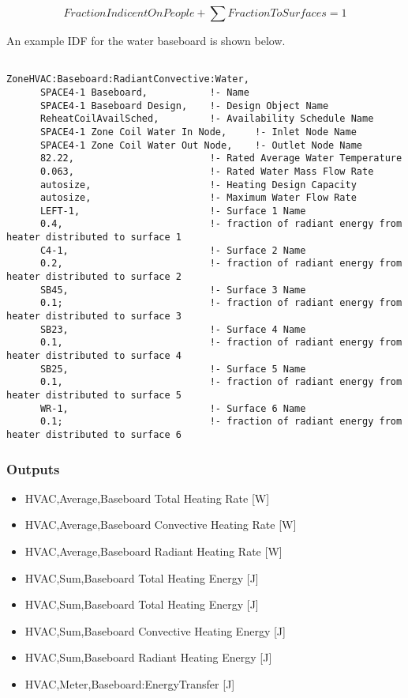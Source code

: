 \begin{equation}
FractionIndicentOnPeople + \sum {FractionToSurfaces = 1}
\end{equation}

An example IDF for the water baseboard is shown below.

\begin{lstlisting}

ZoneHVAC:Baseboard:RadiantConvective:Water,
      SPACE4-1 Baseboard,           !- Name
      SPACE4-1 Baseboard Design,    !- Design Object Name
      ReheatCoilAvailSched,         !- Availability Schedule Name
      SPACE4-1 Zone Coil Water In Node,     !- Inlet Node Name
      SPACE4-1 Zone Coil Water Out Node,    !- Outlet Node Name
      82.22,                        !- Rated Average Water Temperature
      0.063,                        !- Rated Water Mass Flow Rate
      autosize,                     !- Heating Design Capacity
      autosize,                     !- Maximum Water Flow Rate
      LEFT-1,                       !- Surface 1 Name
      0.4,                          !- fraction of radiant energy from heater distributed to surface 1
      C4-1,                         !- Surface 2 Name
      0.2,                          !- fraction of radiant energy from heater distributed to surface 2
      SB45,                         !- Surface 3 Name
      0.1;                          !- fraction of radiant energy from heater distributed to surface 3
      SB23,                         !- Surface 4 Name
      0.1,                          !- fraction of radiant energy from heater distributed to surface 4
      SB25,                         !- Surface 5 Name
      0.1,                          !- fraction of radiant energy from heater distributed to surface 5
      WR-1,                         !- Surface 6 Name
      0.1;                          !- fraction of radiant energy from heater distributed to surface 6
\end{lstlisting}


\subsubsection{Outputs}\label{outputs-027}

\begin{itemize}
\item
  HVAC,Average,Baseboard Total Heating Rate {[}W{]}
\item
  HVAC,Average,Baseboard Convective Heating Rate {[}W{]}
\item
  HVAC,Average,Baseboard Radiant Heating Rate {[}W{]}
\item
  HVAC,Sum,Baseboard Total Heating Energy {[}J{]}
\item
  HVAC,Sum,Baseboard Total Heating Energy {[}J{]}
\item
  HVAC,Sum,Baseboard Convective Heating Energy {[}J{]}
\item
  HVAC,Sum,Baseboard Radiant Heating Energy {[}J{]}
\item
  HVAC,Meter,Baseboard:EnergyTransfer {[}J{]}
\end{itemize}

